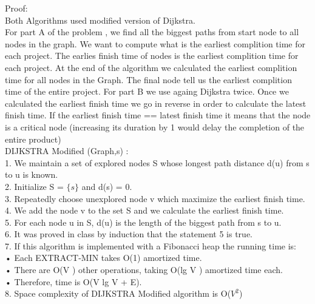 \documentclass[10 pt]{article}
\begin{document}
Proof: \\
Both Algorithms used modified version of Dijkstra. 
\\For part A of the problem , we find all the biggest paths from start node to all nodes in the graph. We want to compute what is the earliest complition time for each project. The earlies finish time of nodes is the earliest complition time for each project. At the end of the algorithm we calculated the earliest complition time for all nodes in the Graph. The final node tell us the earliest complition time of the entire project.  For part B we use againg Dijkstra twice. Once we calculated the earliest finish time we go in reverse in order to calculate the latest finish time. If the earliest finish time == latest finish time it means that the node is a critical node (increasing its duration by 1 would delay the completion of the entire product) \\
DIJKSTRA Modified  (Graph,s) :\\
1. We maintain a set of explored nodes S whose  longest path distance d(u) from s to u is known.\\
2. Initialize S = $\{s\}$ and d(s) = 0.\\
3. Repeatedly choose unexplored node  v which maximize the earliest finish time.\\
4. We add the node v to the set S and we calculate the earliest finish time.\\
5. For each node u in S, d(u) is the length of the biggest path from s to u.\\
6. It was proved in class by induction that the statement 5 is true.\\
7. If this algorithm is implemented with a Fibonacci heap the running time is:\\
• Each EXTRACT-MIN takes O(1) amortized time.\\
• There are O(V ) other operations, taking O(lg V ) amortized time each.\\
• Therefore, time is O(V lg V + E).\\
8. Space complexity of DIJKSTRA Modified algorithm is O($V^2$)\\
\end{document}
